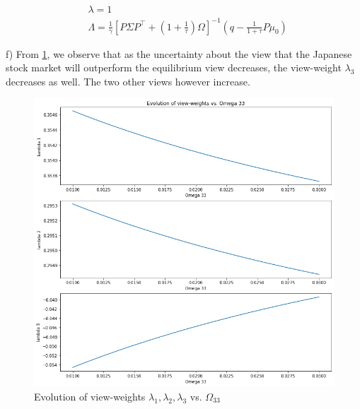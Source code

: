 \documentclass[10pt]{article}
\begin{document}
\begin{align*}
	&\lambda = 1\\
	&\Lambda = \frac{1}{\gamma} \left[ P\Sigma P^\top  + \left( 1 + \frac{1}{\tau} \right) \Omega \right]^{-1} \left( q - \frac{1}{1+\tau} P \mu_0 \right)
\end{align*}

\bigbreak

f) From \ref{fig:fig1}, we observe that as the uncertainty about the view that the Japanese stock market will outperform the equilibrium view decreases, the view-weight $\lambda_3$ decreases as well. The two  other views however increase.

\begin{figure}[H]
          \centering
          \includegraphics[scale=0.5]{ex2_1.png}
          \caption{Evolution of view-weights $\lambda_1, \lambda_2, \lambda_3$ vs. $\Omega_{33}$}
          \label{fig:fig1}
\end{figure}
\end{document}
